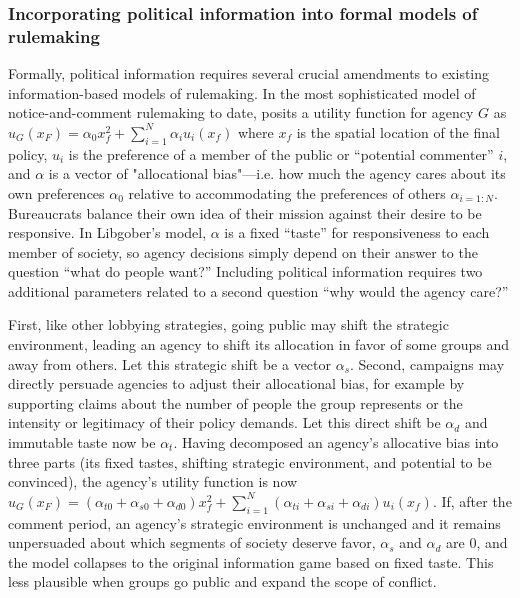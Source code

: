 \subsubsection{Incorporating political information into formal models of rulemaking}

Formally, political information requires several crucial amendments to existing information-based models of rulemaking. In the most sophisticated model of notice-and-comment rulemaking to date, \citet{Libgober2018} posits a utility function for agency $G$ as $u_G(x_F) = \alpha_0 x_f^2 + \sum_{i=1}^N \alpha_i u_i (x_f)$ where $x_f$ is the spatial location of the final policy, $u_i$ is the preference of a member of the public or ``potential commenter'' $i$, and $\alpha$ is a vector of "allocational bias"---i.e. how much the agency cares about its own preferences $\alpha_0$ relative to accommodating the preferences of others $\alpha_{i=1:N}$. Bureaucrats balance their own idea of their mission against their desire to be responsive. In Libgober's model, $\alpha$ is a fixed ``taste'' for responsiveness to each member of society, so agency decisions simply depend on their answer to the question ``what do people want?'' Including political information requires two additional parameters related to a second question ``why would the agency care?''

First, like other lobbying strategies, going public may shift the strategic environment, leading an agency to shift its allocation in favor of some groups and away from others. Let this strategic shift be a vector $\alpha_s$. Second, campaigns may directly persuade agencies to adjust their allocational bias, for example by supporting claims about the number of people the group represents or the intensity or legitimacy of their policy demands. Let this direct shift be $\alpha_d$ and immutable taste now be $\alpha_t$. Having decomposed an agency's allocative bias into three parts (its fixed tastes, shifting strategic environment, and potential to be convinced), the agency's utility function is now  $u_G(x_F) =  (\alpha_{t0} + \alpha_{s0} + \alpha_{d0}) x_f^2 + \sum_{i=1}^N (\alpha_{ti} + \alpha_{si} + \alpha_{di}) u_i (x_f)$. If, after the comment period, an agency's strategic environment is unchanged and it remains unpersuaded about which segments of society deserve favor, $\alpha_s$ and $\alpha_d$ are 0, and the model collapses to the original information game based on fixed taste. This less plausible when groups go public and expand the scope of conflict. 


